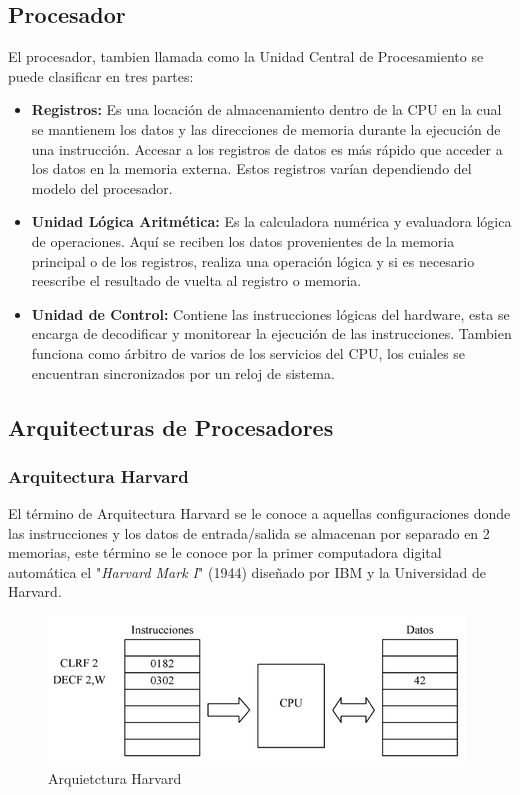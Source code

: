 \documentclass[letterpaper,12pt,oneside]{book}
\begin{document}
			\subsection{Procesador}
			El procesador, tambien llamada como la Unidad Central de Procesamiento se puede clasificar en tres partes:
		
			\begin{itemize}
				\item \textbf{Registros:} Es una locación de almacenamiento dentro de la CPU en la cual se mantienem los datos y las direcciones de memoria durante la ejecución de una instrucción. Accesar a los registros de datos es más rápido que acceder a los datos en la memoria externa. Estos registros varían dependiendo del modelo del procesador.

				\item \textbf{Unidad Lógica Aritmética:} Es la calculadora numérica y evaluadora lógica de operaciones. Aquí se reciben los datos provenientes de la memoria principal o de los registros, realiza una operación lógica y si es necesario reescribe el resultado de vuelta al registro o memoria.

				\item \textbf{Unidad de Control:} Contiene las instrucciones lógicas del hardware, esta se encarga de decodificar y monitorear la ejecución de las instrucciones. Tambien funciona como árbitro de varios de los servicios del CPU, los cuiales se encuentran sincronizados por un reloj de sistema.
			\end{itemize}

			\subsection{Arquitecturas de Procesadores}

				\subsubsection{Arquitectura Harvard}
				El término de Arquitectura Harvard se le conoce a aquellas configuraciones donde las instrucciones y los datos de entrada/salida se almacenan por separado en 2 memorias, este término se le conoce por la primer computadora digital automática el "\textit{Harvard Mark I}" (1944) diseñado por IBM y la Universidad de Harvard\cite{cuellar2008sistemas}.

				\begin{figure}[!htpb]
					\centering
					\includegraphics[scale = 1.0]{Material de Consulta/ArqHrv.PNG}
					\caption[Arquietctura Harvard]{Arquietctura Harvard}
					\label{ArqHrv}
				\end{figure}
\end{document}
